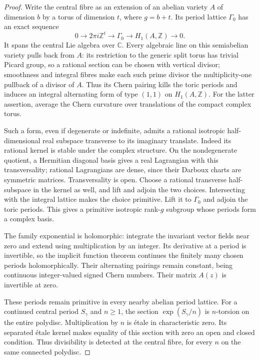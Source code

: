 \begin{proof}
Write the central fibre as an extension of an abelian variety
$A$ of dimension $b$ by a torus of dimension $t$, where $g=b+t$.
Its period lattice $\Gamma_0$ has an exact sequence
\[
 0\longrightarrow2\pi i\mathbb Z^t\longrightarrow\Gamma_0
                \longrightarrow H_1(A,\mathbb Z)\longrightarrow0.
\]
It spans the central Lie algebra over $\mathbb C$.
Every algebraic line on this semiabelian variety pulls back from
$A$: its restriction to the generic split torus has trivial
Picard group, so a rational section can be chosen with vertical
divisor; smoothness and integral fibres make each such prime
divisor the multiplicity-one pullback of a divisor of $A$.
Thus its Chern pairing kills the toric periods and induces an
integral alternating form of type $(1,1)$ on $H_1(A,\mathbb Z)$.
For the latter assertion, average the Chern curvature over
translations of the compact complex torus.

Such a form, even if degenerate or indefinite, admits a rational
isotropic half-dimensional real subspace transverse to its
imaginary translate. Indeed its rational kernel is stable under
the complex structure. On the nondegenerate quotient, a Hermitian
diagonal basis gives a real Lagrangian with this transversality;
rational Lagrangians are dense, since their Darboux charts are
symmetric matrices. Transversality is open. Choose a rational
transverse half-subspace in the kernel as well, and lift and
adjoin the two choices. Intersecting with the integral lattice
makes the choice primitive. Lift it to $\Gamma_0$ and adjoin
the toric periods. This gives a primitive isotropic rank-$g$
subgroup whose periods form a complex basis.

The family exponential is holomorphic: integrate the invariant
vector fields near zero and extend using multiplication by an
integer. Its derivative at a period is invertible, so the implicit
function theorem continues the finitely many chosen periods
holomorphically. Their alternating pairings remain constant,
being continuous integer-valued signed Chern numbers. Their matrix $A(z)$
is invertible at zero.

These periods remain primitive in every nearby abelian period
lattice. For a continued central period $S_\gamma$ and $n\ge1$,
the section $\exp(S_\gamma/n)$ is $n$-torsion on the entire
polydisc. Multiplication by $n$ is étale in characteristic zero.
Its separated étale kernel makes equality of this section with
zero an open and closed condition. Thus divisibility is detected
at the central fibre, for every $n$ on the same connected
polydisc.


\end{proof}
